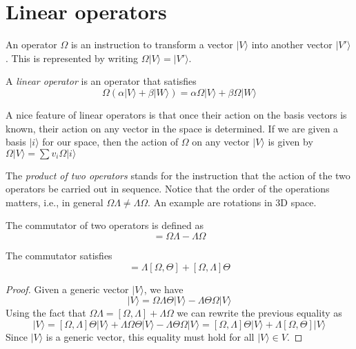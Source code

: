 \documentclass[11pt,fleqn]{book} %
\newcommand{\ket}[1]{| #1\rangle}
\begin{document}
\section{Linear operators}
An operator $\Omega$ is an instruction to transform a vector $\ket{V}$ into another vector $\ket{V'}$. This is represented by writing
$\Omega\ket{V}=\ket{V'}$.

\begin{definition}
A \textit{linear operator} is an operator that satisfies
\begin{equation*}
    \Omega(\alpha\ket{V}+\beta\ket{W}) = \alpha\Omega\ket{V} + \beta\Omega\ket{W}
\end{equation*}
\end{definition}

\begin{remark}
    A nice feature of linear operators is that once their action on the basis vectors is known, their action on any vector in the space
    is determined. If we are given a basis $\ket{i}$ for our space, then the action of $\Omega$ on any vector $\ket{V}$ is given 
    by $\Omega\ket{V} = \sum v_i\Omega\ket{i}$
\end{remark}

The \textit{product of two operators} stands for the instruction that the action of the two operators be carried out in sequence.
Notice that the order of the operations matters, i.e., in general $\Omega\Lambda\neq\Lambda\Omega$. An example are rotations in 3D space.
\begin{definition}[Commutator]
    The commutator of two operators is defined as 
    \begin{equation*}
        [\Omega,\Lambda] = \Omega\Lambda-\Lambda\Omega
    \end{equation*}
\end{definition}

\begin{theorem}
    The commutator satisfies 
    \begin{equation}
        [\Omega, \Lambda\Theta] = \Lambda[\Omega, \Theta] + [\Omega, \Lambda]\Theta
    \end{equation}        
\end{theorem}
\begin{proof}
    Given a generic vector $\ket{V}$, we have
    \begin{equation*}
        [\Omega, \Lambda\Theta]\ket{V} = \Omega\Lambda\Theta\ket{V} - \Lambda\Theta\Omega\ket{V}
    \end{equation*}
Using the fact that $\Omega\Lambda = [\Omega,\Lambda]+\Lambda\Omega$ we can rewrite the previous equality as
\begin{equation*}
    [\Omega, \Lambda\Theta]\ket{V} = 
    [\Omega,\Lambda]\Theta\ket{V}+\Lambda\Omega\Theta\ket{V} - \Lambda\Theta\Omega\ket{V} =
    [\Omega,\Lambda]\Theta\ket{V} + \Lambda[\Omega,\Theta]\ket{V}
\end{equation*}
Since $\ket{V}$ is a generic vector, this equality must hold for all $\ket{V}\in V$.
\end{proof}
\end{document}
